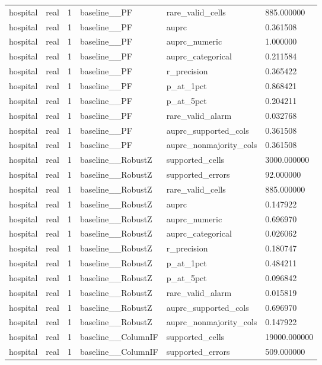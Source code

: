 \begin{tabular}{llllll}
hospital & real & 1 & baseline\_\_PF & rare\_valid\_cells & 885.000000 \\
hospital & real & 1 & baseline\_\_PF & auprc & 0.361508 \\
hospital & real & 1 & baseline\_\_PF & auprc\_numeric & 1.000000 \\
hospital & real & 1 & baseline\_\_PF & auprc\_categorical & 0.211584 \\
hospital & real & 1 & baseline\_\_PF & r\_precision & 0.365422 \\
hospital & real & 1 & baseline\_\_PF & p\_at\_1pct & 0.868421 \\
hospital & real & 1 & baseline\_\_PF & p\_at\_5pct & 0.204211 \\
hospital & real & 1 & baseline\_\_PF & rare\_valid\_alarm & 0.032768 \\
hospital & real & 1 & baseline\_\_PF & auprc\_supported\_cols & 0.361508 \\
hospital & real & 1 & baseline\_\_PF & auprc\_nonmajority\_cols & 0.361508 \\
hospital & real & 1 & baseline\_\_RobustZ & supported\_cells & 3000.000000 \\
hospital & real & 1 & baseline\_\_RobustZ & supported\_errors & 92.000000 \\
hospital & real & 1 & baseline\_\_RobustZ & rare\_valid\_cells & 885.000000 \\
hospital & real & 1 & baseline\_\_RobustZ & auprc & 0.147922 \\
hospital & real & 1 & baseline\_\_RobustZ & auprc\_numeric & 0.696970 \\
hospital & real & 1 & baseline\_\_RobustZ & auprc\_categorical & 0.026062 \\
hospital & real & 1 & baseline\_\_RobustZ & r\_precision & 0.180747 \\
hospital & real & 1 & baseline\_\_RobustZ & p\_at\_1pct & 0.484211 \\
hospital & real & 1 & baseline\_\_RobustZ & p\_at\_5pct & 0.096842 \\
hospital & real & 1 & baseline\_\_RobustZ & rare\_valid\_alarm & 0.015819 \\
hospital & real & 1 & baseline\_\_RobustZ & auprc\_supported\_cols & 0.696970 \\
hospital & real & 1 & baseline\_\_RobustZ & auprc\_nonmajority\_cols & 0.147922 \\
hospital & real & 1 & baseline\_\_ColumnIF & supported\_cells & 19000.000000 \\
hospital & real & 1 & baseline\_\_ColumnIF & supported\_errors & 509.000000 \\

\end{tabular}
